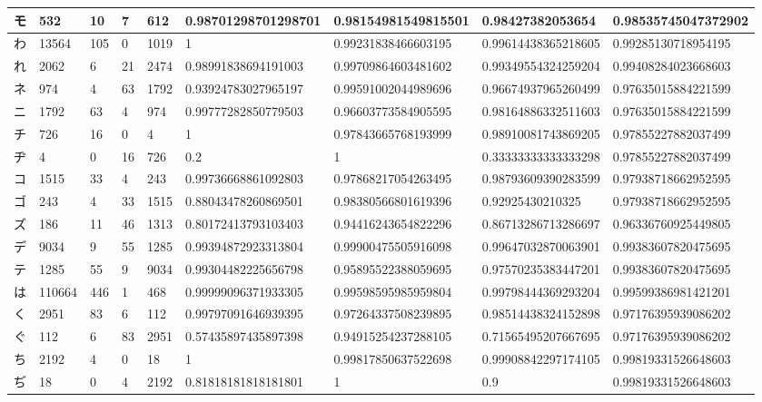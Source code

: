 \begin{table}[H]
\begin{center}
\begin{CJK}{UTF8}{min}
\begin{tabular}{ | l | l | l | l | l | l | l | l | l | }
			モ & 532 & 10 & 7 & 612 & 0.98701298701298701 & 0.98154981549815501 & 0.98427382053654 & 0.98535745047372902 \\ \hline
			わ & 13564 & 105 & 0 & 1019 & 1 & 0.99231838466603195 & 0.99614438365218605 & 0.99285130718954195 \\ \hline
			れ & 2062 & 6 & 21 & 2474 & 0.98991838694191003 & 0.99709864603481602 & 0.99349554324259204 & 0.99408284023668603 \\ \hline
			ネ & 974 & 4 & 63 & 1792 & 0.93924783027965197 & 0.99591002044989696 & 0.96674937965260499 & 0.97635015884221599 \\ \hline
			ニ & 1792 & 63 & 4 & 974 & 0.99777282850779503 & 0.96603773584905595 & 0.98164886332511603 & 0.97635015884221599 \\ \hline
			チ & 726 & 16 & 0 & 4 & 1 & 0.97843665768193999 & 0.98910081743869205 & 0.97855227882037499 \\ \hline
			ヂ & 4 & 0 & 16 & 726 & 0.2 & 1 & 0.33333333333333298 & 0.97855227882037499 \\ \hline
			コ & 1515 & 33 & 4 & 243 & 0.99736668861092803 & 0.97868217054263495 & 0.98793609390283599 & 0.97938718662952595 \\ \hline
			ゴ & 243 & 4 & 33 & 1515 & 0.88043478260869501 & 0.98380566801619396 & 0.92925430210325 & 0.97938718662952595 \\ \hline
			ズ & 186 & 11 & 46 & 1313 & 0.80172413793103403 & 0.94416243654822296 & 0.86713286713286697 & 0.96336760925449805 \\ \hline
			デ & 9034 & 9 & 55 & 1285 & 0.99394872923313804 & 0.99900475505916098 & 0.99647032870063901 & 0.99383607820475695 \\ \hline
			テ & 1285 & 55 & 9 & 9034 & 0.99304482225656798 & 0.95895522388059695 & 0.97570235383447201 & 0.99383607820475695 \\ \hline
			は & 110664 & 446 & 1 & 468 & 0.99999096371933305 & 0.99598595985959804 & 0.99798444369293204 & 0.99599386981421201 \\ \hline
			く & 2951 & 83 & 6 & 112 & 0.99797091646939395 & 0.97264337508239895 & 0.98514438324152898 & 0.97176395939086202 \\ \hline
			ぐ & 112 & 6 & 83 & 2951 & 0.57435897435897398 & 0.94915254237288105 & 0.71565495207667695 & 0.97176395939086202 \\ \hline
			ち & 2192 & 4 & 0 & 18 & 1 & 0.99817850637522698 & 0.99908842297174105 & 0.99819331526648603 \\ \hline
			ぢ & 18 & 0 & 4 & 2192 & 0.81818181818181801 & 1 & 0.9 & 0.99819331526648603 \\ \hline

\end{tabular}
\end{CJK}
\end{center}
\end{table}

